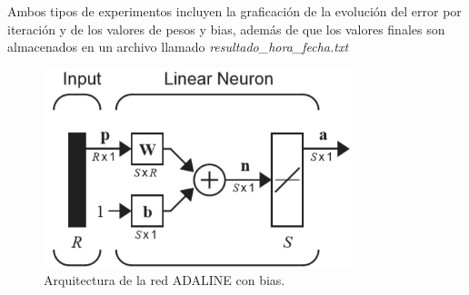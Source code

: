 Ambos tipos de experimentos incluyen la graficación de la evolución del error por iteración y de los valores de pesos y bias, además de que los valores finales son almacenados en un archivo llamado \emph{resultado\_hora\_fecha.txt}
\begin{figure}[H]
    \begin{center}
        \includegraphics[width=9cm]{img/adaline/arquitectura.png}
        \caption{Arquitectura de la red ADALINE con bias. \cite{libro1}}
        \label{fig:adaline-diagrama2}
    \end{center}
\end{figure}
